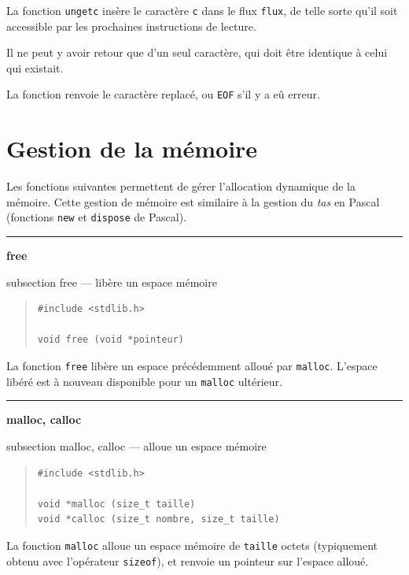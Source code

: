 \documentclass [twoside] {report}
\newcommand {\primitive} [1]
    {
	\phantomsection
	{\large \textbf {#1}}
	\addcontentsline {toc} {subsection} {#1}
    }
\newcommand {\separation}
    {
	\vspace {5mm}
	\nopagebreak
	\hrule
    }
\begin{document}
La fonction \texttt {ungetc} insère le caractère \texttt {c} dans le
flux \texttt {flux}, de telle sorte qu'il soit accessible par les
prochaines instructions de lecture.

Il ne peut y avoir retour que d'un seul caractère, qui doit
être identique à celui qui existait.

La fonction renvoie le caractère replacé, ou \texttt {EOF} s'il y
a eû erreur.




\section {Gestion de la mémoire}


Les fonctions suivantes permettent de gérer l'allocation
dynamique de la mémoire. Cette gestion de mémoire est
similaire à la gestion du \emph {tas} en Pascal (fonctions \texttt {new}
et \texttt {dispose} de Pascal).




\separation
\primitive {free} --- libère un espace mémoire

\begin {quote}
\begin {verbatim}
#include <stdlib.h>

void free (void *pointeur)
\end{verbatim}
\end {quote}

La fonction \texttt {free} libère un espace précédemment alloué
par \texttt {malloc}. L'espace libéré est à nouveau disponible pour
un \texttt {malloc} ultérieur.



\separation
\primitive {malloc, calloc} --- alloue un espace mémoire

\begin {quote}
\begin {verbatim}
#include <stdlib.h>

void *malloc (size_t taille)
void *calloc (size_t nombre, size_t taille)
\end{verbatim}
\end {quote}

La fonction \texttt {malloc} alloue un espace mémoire de
\texttt {taille} octets (typiquement obtenu avec l'opérateur
\texttt {sizeof}), et renvoie un pointeur sur l'espace alloué.
\end{document}
